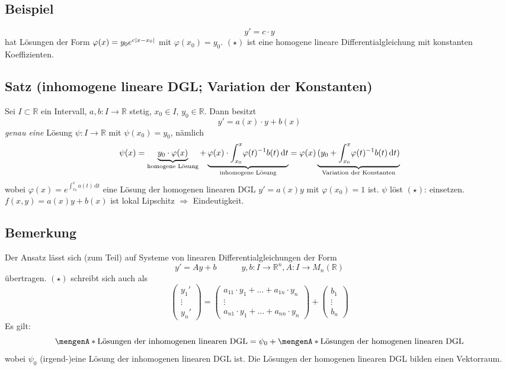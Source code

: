 \subsection[Beispiel: homogene, lineare DGL mit konstanten Koeffizienten]{Beispiel} %
\label{sub:24}
\[
	y' = c \cdot y \tag{$\star$}
\]
hat Lösungen der Form $\varphi(x)= y_0 e^{c \lvert x-x_0\rvert }$ mit $\varphi(x_0)=y_0$. $(\star)$ ist eine homogene lineare Differentialgleichung mit konstanten 
Koeffizienten. 

\subsection{Satz (inhomogene lineare DGL; Variation der Konstanten)} %
\label{sub:25}
Sei $I \subset \mathds{R}$ ein Intervall, $a,b : I \to \mathds{R}$ stetig, $x_0 \in I$, $y_0 \in \mathds{R}$. Dann besitzt 
\[
	y' = a(x)\cdot y + b(x) \tag{$\star$}
\]
\emph{genau eine} Lösung $\psi : I \to \mathds{R}$ mit $\psi(x_0)=y_0$, nämlich
\[
	\psi(x) = \underbrace{y_0 \cdot \varphi(x)}_{\text{homogene Lösung}}+ \underbrace{\varphi(x) \cdot \int_{x_0} ^{x} \! \varphi(t) ^{-1} b(t)  \,
	 \mathrm{d}t}_{\text{inhomogene Lösung}} = \varphi(x) \underbrace{(y_0 + \int_{x_0} ^{x} \! 
	\varphi(t) ^{-1} b(t)  \, \mathrm{d}t)}_{\text{Variation der Konstanten}} 
\]
wobei $\varphi(x)= e^{\int_{x_0} ^{x} \! a(t)  \, \mathrm{d}t}$ eine Lösung der homogenen linearen DGL $y'=a(x)y$ mit $\varphi(x_0)= 1$ ist.
$\psi$ löst $(\star)$: einsetzen. 
$f(x,y)= a(x)y + b(x)$ ist lokal Lipschitz $\Rightarrow $ Eindeutigkeit. \bewende

\subsection[Bemerkung: Variation der Konstanten bei System von linearen DGL]{Bemerkung} %
\label{sub:26}
Der Ansatz lässt sich (zum Teil) auf Systeme von linearen Differentialgleichungen der Form
\[
	y' = Ay+b \qquad \quad y,b : I \to \mathds{R}^n, A : I \to M_n(\mathds{R}) \tag{$\star$}
\]
übertragen. $(\star)$ schreibt sich auch als
\[
	\begin{pmatrix}
		y_1' \\ \vdots \\ y_n'
	\end{pmatrix} = \begin{pmatrix}
		a_{11}\cdot y_1 + \ldots + a_{1n}\cdot y_n \\
		\vdots \\
		a_{n1}\cdot y_1 + \ldots + a_{nn}\cdot y_n
	\end{pmatrix} + \begin{pmatrix}
		b_1 \\ \vdots \\ b_n
	\end{pmatrix}
\]
Es gilt: 
\[
	\set{\text{Lösungen der inhomogenen linearen DGL}} = \psi_0 + \set{\text{Lösungen der homogenen linearen DGL}}  
\]
wobei $\psi_0$ (irgend-)eine Lösung der inhomogenen linearen DGL ist. Die Lösungen der homogenen linearen DGL bilden einen Vektorraum.

